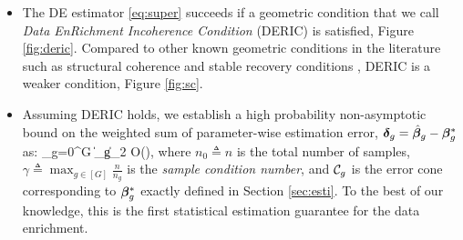 \begin{itemize}[leftmargin = .4cm]
	\item The DE estimator \eqref{eq:super} succeeds if a geometric condition that we call \emph{Data EnRichment Incoherence Condition} (DERIC) is satisfied, Figure \ref{fig:deric}. Compared to other known geometric conditions in the literature such as structural coherence \cite{guba16} and stable recovery conditions \cite{mctr13}, DERIC is a weaker condition, Figure \ref{fig:sc}.
	\item Assuming DERIC holds, we establish a high probability non-asymptotic bound on the weighted sum of parameter-wise estimation error, $\boldsymbol{\delta}_g = \hat{\boldsymbol{\beta}}_g - \boldsymbol{\beta}_g^*$ as:
	\be
	\label{eq:errorsum}
	\sum_{g=0}^{G}   \|\ddelta_g\|_2 \leq  \gamma O\left(\right),
	\ee
	where $n_0 \triangleq n$ is the total number of samples, $\gamma \triangleq \max_{g \in [G] } \frac{n}{n_g}$ is the \emph{sample condition number}, and ${\cal C}_g$ is the error cone corresponding to $\boldsymbol{\beta}_g^*$ exactly defined in Section \ref{sec:esti}.
	To the best of our knowledge, this is the first statistical estimation guarantee for the data enrichment.%
	

\end{itemize}
